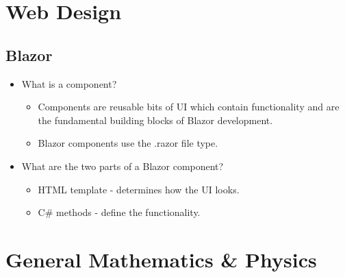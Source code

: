 \documentclass{article}
\begin{document}
\newpage
\section{Web Design}
\subsection{Blazor}
\begin{itemize}
    \item What is a component?
    \begin{itemize}
        \item Components are reusable bits of UI which contain functionality and are the fundamental building blocks of Blazor development.
        \item Blazor components use the .razor file type.
    \end{itemize}
    \item What are the two parts of a Blazor component?
    \begin{itemize}
        \item HTML template - determines how the UI looks.
        \item C\# methods - define the functionality.
    \end{itemize}
\end{itemize}

\newpage
\section{General Mathematics \& Physics}
\end{document}
